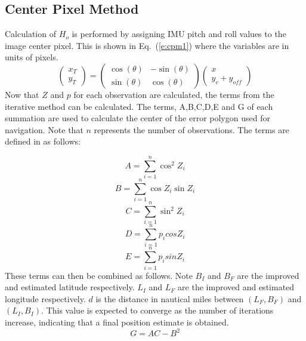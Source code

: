 \documentclass[12pt,a4paper]{book}
\begin{document}
\subsection{Center Pixel Method}
Calculation of $H_{o}$ is performed by assigning IMU pitch and roll values to the image center pixel.  This is shown in Eq.~(\ref{e:cpm1}) where the variables are in units of pixels.
\begin{equation}
    \label{e:cpm1}
       \begin{pmatrix} 
  x_{T}     \\ 
  y_{T} 
\end{pmatrix}=\begin{pmatrix} 
  \cos(\theta)     & -\sin(\theta)\\ 
  \sin(\theta) & \cos(\theta) 
\end{pmatrix}\begin{pmatrix} 
  x\\ 
  y_{c} + y_{off} 
\end{pmatrix}
\end{equation}
Now that $Z$ and $p$ for each observation are calculated, the terms from the iterative method can be calculated. The terms, A,B,C,D,E and G of each summation are used to calculate the center of the error polygon used for navigation.  Note that $n$ represents the number of observations.  The terms are defined in as follows:

\begin{equation}
A = \sum \limits_{i=1}^n \cos^{2}Z_{i}
\end{equation}
\begin{equation}
B = \sum \limits_{i=1}^n \cos Z_{i} \sin Z_{i}
\end{equation}
\begin{equation}
C = \sum \limits_{i=1}^n \sin^{2}Z_{i}
\end{equation}
\begin{equation}
D = \sum \limits_{i=1}^n p_{i}cosZ_{i}
\end{equation}
\begin{equation}
E = \sum \limits_{i=1}^n p_{i}sinZ_{i}
\end{equation}
These terms can then be combined as follows. Note $B_{I}$ and $B_{F}$ are the improved and estimated latitude respectively.  $L_{I}$ and $L_{F}$ are the improved and estimated longitude respectively.  $d$ is the distance in nautical miles between $(L_{F}, B_{F})$ and $(L_{I}, B_{I})$.  This value is expected to converge as the number of iterations increase, indicating that a final position estimate is obtained.
\begin{equation}
 \label{e:G}
    G = AC-B^{2}
\end{equation}
\end{document}
